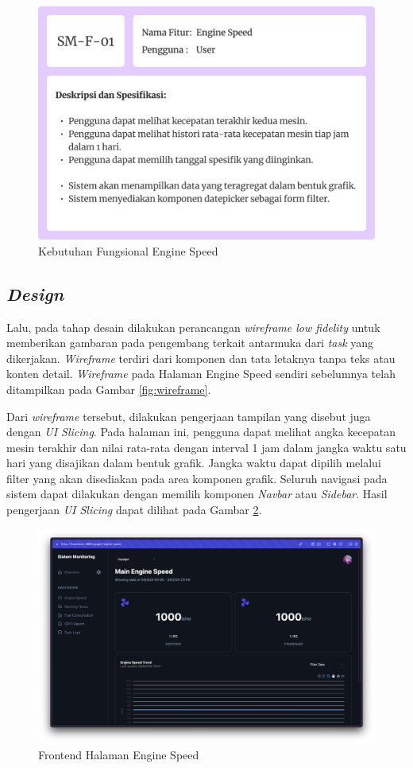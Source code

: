\begin{figure}[!h]
    \includegraphics[width=.8\linewidth, center]{images/hasil/iterations/1/fr-es.png}
    \caption{Kebutuhan Fungsional Engine Speed}
    \label{fig:fr-es}
\end{figure}

\subsection{\textit{Design}}

Lalu, pada tahap desain dilakukan perancangan \textit{wireframe low fidelity} untuk memberikan gambaran pada pengembang terkait antarmuka dari \textit{task} yang dikerjakan. \textit{Wireframe} terdiri dari komponen dan tata letaknya tanpa teks atau konten detail. \textit{Wireframe} pada Halaman Engine Speed sendiri sebelumnya telah ditampilkan pada Gambar \ref{fig:wireframe}.

Dari \textit{wireframe} tersebut, dilakukan pengerjaan tampilan yang disebut juga dengan \textit{UI Slicing}. Pada halaman ini, pengguna dapat melihat angka kecepatan mesin terakhir dan nilai rata-rata dengan interval 1 jam dalam jangka waktu satu hari yang disajikan dalam bentuk grafik. Jangka waktu dapat dipilih melalui filter yang akan disediakan pada area komponen grafik. Seluruh navigasi pada sistem dapat dilakukan dengan memilih komponen \textit{Navbar} atau \textit{Sidebar}. Hasil pengerjaan \textit{UI Slicing} dapat dilihat pada Gambar \ref{fig:fe-es}.

\begin{figure}[!h]
    \includegraphics[width=1.05\linewidth, center]{images/hasil/iterations/1/fe-es.png}
    \caption{Frontend Halaman Engine Speed}
    \label{fig:fe-es}
\end{figure}

